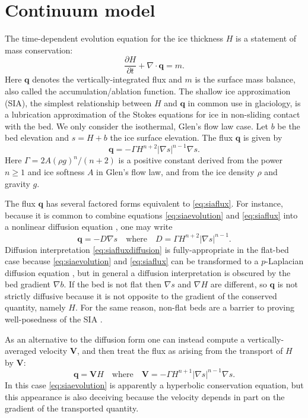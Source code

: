 \documentclass[review,letterpaper]{igs}
\newcommand\bq{\mathbf{q}}
\newcommand\bV{\mathbf{V}}
\newcommand{\Div}{\nabla\cdot}
\newcommand{\grad}{\nabla}
\begin{document}
\section{Continuum model}

The time-dependent evolution equation for the ice thickness $H$ is a statement of mass conservation:
\begin{equation}
\frac{\partial H}{\partial t} + \Div \bq = m.  \label{eq:siaevolution}
\end{equation}
Here $\bq$ denotes the vertically-integrated flux and $m$ is the surface mass balance, also called the accumulation/ablation function.  The shallow ice approximation (SIA), the simplest relationship between $H$ and $\bq$ in common use in glaciology, is a lubrication approximation \citep{Fowler1997} of the Stokes equations for ice in non-sliding contact with the bed.  We only consider the isothermal, Glen's flow law \citep{GreveBlatter2009} case.  Let $b$ be the bed elevation and $s = H+b$ the ice surface elevation.  The flux $\bq$ is given by
\begin{equation}
\bq = - \Gamma H^{n+2} |\grad s|^{n-1} \grad s.  \label{eq:siaflux}
\end{equation}
Here $\Gamma = 2 A (\rho g)^n / (n+2)$ is a positive constant derived from the power $n\ge 1$ and ice softness $A$ in Glen's flow law, and from the ice density $\rho$ and gravity $g$.

The flux $\bq$ has several factored forms equivalent to \eqref{eq:siaflux}.  For instance, because it is common to combine equations \eqref{eq:siaevolution} and \eqref{eq:siaflux} into a nonlinear diffusion equation \citep{Huybrechtsetal1996}, one may write
\begin{equation}
\bq = - D \grad s \quad \text{where} \quad D =  \Gamma H^{n+2} |\grad s|^{n-1}. \label{eq:siafluxdiffusion}
\end{equation}
Diffusion interpretation \eqref{eq:siafluxdiffusion} is fully-appropriate in the flat-bed case because \eqref{eq:siaevolution} and \eqref{eq:siaflux} can be transformed to a $p$-Laplacian diffusion equation \citep{Calvoetal2002}, but in general a diffusion interpretation is obscured by the bed gradient $\grad b$.  If the bed is not flat then $\grad s$ and $\grad H$ are different, so $\bq$ is not strictly diffusive because it is not opposite to the gradient of the conserved quantity, namely $H$.  For the same reason, non-flat beds are a barrier to proving well-posedness of the SIA  \citep{JouvetBueler2012}.

As an alternative to the diffusion form one can instead compute a vertically-averaged velocity $\bV$, and then treat the flux as arising from the transport of $H$ by $\bV$:
\begin{equation}
\bq = \bV H \quad \text{where} \quad \bV = - \Gamma H^{n+1} |\grad s|^{n-1} \grad s. \label{eq:siafluxvelocity}
\end{equation}
In this case \eqref{eq:siaevolution} is apparently a hyperbolic conservation equation, but this appearance is also deceiving because the velocity depends in part on the gradient of the transported quantity. 
\end{document}

